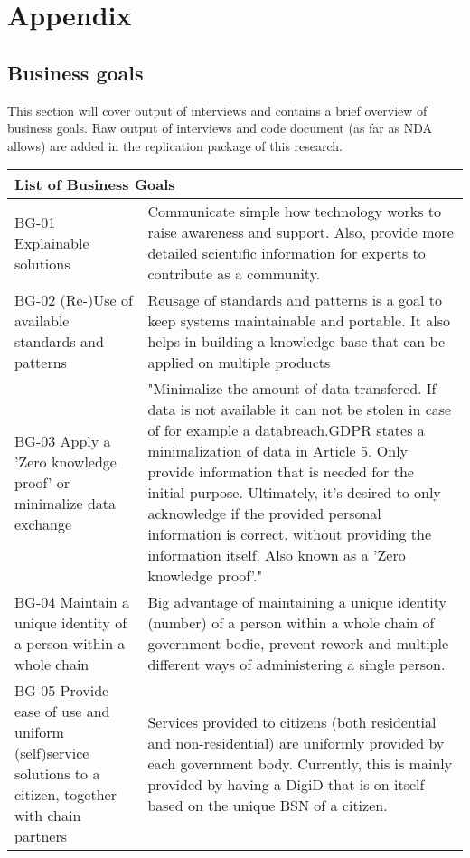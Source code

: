 
\chapter*{Appendix} %

\section*{Business goals}
This section will cover output of interviews and contains a brief overview of business goals. Raw output of interviews and code document (as far as NDA allows) are added in the replication package of this research.\\

\begin{tabular}{ |p{5cm}||p{11cm}|}
 \hline
 \multicolumn{2}{|l|}{List of Business Goals} \\
 \hline
 BG-01 Explainable solutions   &   Communicate simple how technology works to raise awareness and support. Also, provide more detailed scientific information for experts to contribute as a community.     \\
 \hline
 BG-02 (Re-)Use of available standards and patterns &  Reusage of standards and patterns is a goal to keep systems maintainable and portable. It also helps in building a knowledge base that can be applied on multiple products \\
  \hline
 BG-03 Apply a 'Zero knowledge proof' or minimalize data exchange & "Minimalize the amount of data transfered. If data is not available it can not be stolen in case of for example a databreach.GDPR states a minimalization of data in Article 5. Only provide information that is needed for the initial purpose.
Ultimately, it's desired to only acknowledge if the provided personal information is correct, without providing the information itself. Also known as a 'Zero knowledge proof'."  \\
  \hline
BG-04 Maintain a unique identity of a person within a whole chain & Big advantage of maintaining a unique identity (number) of a person within a whole chain of government bodie, prevent rework and multiple different ways of administering a single person.  \\
  \hline
 BG-05 Provide ease of use and uniform (self)service solutions to a citizen, together with chain partners &  Services provided to citizens (both residential and non-residential) are uniformly provided by each government body. Currently, this is mainly provided by having a DigiD that is on itself based on the unique BSN of a citizen.\\
   \hline
\end{tabular}
\clearpage
